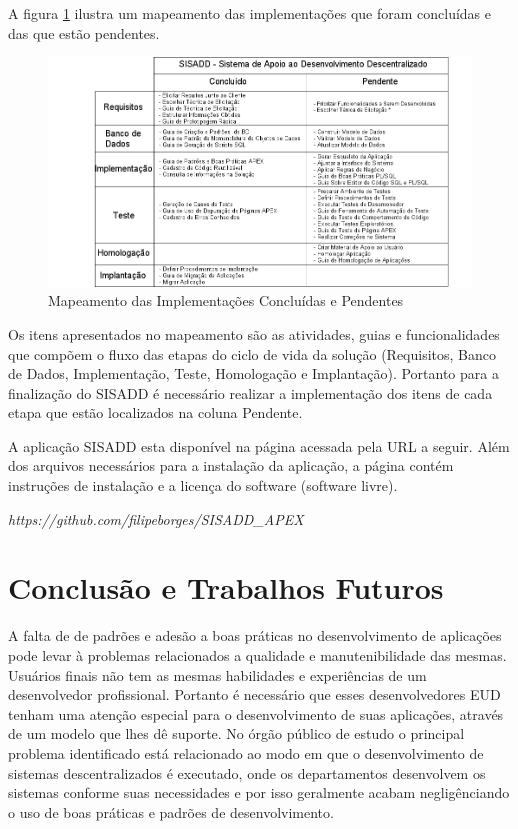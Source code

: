 A figura \ref{implementacao_conc_penden} ilustra um mapeamento das implementações que foram concluídas e das que estão pendentes.

\begin{figure}[!htb]
	\hspace*{-3.8cm}
	\includegraphics[scale=0.68]{figuras/mapa_pendencias}
	\caption{Mapeamento das Implementações Concluídas e Pendentes}
	\label{implementacao_conc_penden}
\end{figure}

Os itens apresentados no mapeamento são as atividades, guias e funcionalidades que compõem o fluxo das etapas do ciclo de vida da solução (Requisitos, Banco de Dados, Implementação, Teste, Homologação e Implantação). Portanto para a finalização do SISADD é necessário realizar a implementação dos itens de cada etapa que estão localizados na coluna Pendente.

A aplicação SISADD esta disponível na página acessada pela URL a seguir. Além dos arquivos necessários para a instalação da aplicação, a página contém instruções de instalação e a licença do software (software livre).

\textit{https://github.com/filipeborges/SISADD\_APEX}

\chapter{Conclusão e Trabalhos Futuros}

A falta de de padrões e adesão a boas práticas no desenvolvimento de aplicações pode levar à problemas relacionados a qualidade e manutenibilidade das mesmas. Usuários finais não tem as mesmas habilidades e experiências de um desenvolvedor profissional. Portanto é necessário que esses desenvolvedores EUD tenham uma atenção especial para o desenvolvimento de suas aplicações, através de um modelo que lhes dê suporte. No órgão público de estudo o principal problema identificado está relacionado ao modo em que o desenvolvimento de sistemas descentralizados é executado, onde os departamentos desenvolvem os sistemas conforme suas necessidades e por isso geralmente acabam negligênciando o uso de boas práticas e padrões de desenvolvimento.

